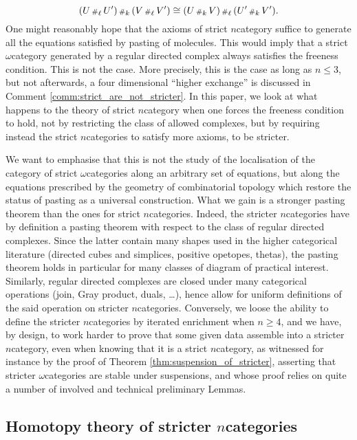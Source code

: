 \begin{equation*}
    (U \,{\scriptstyle\#}_{\ell}\, U') \,{\scriptstyle\#}_{k}\, (V \,{\scriptstyle\#}_{\ell}\, V') \cong (U \,{\scriptstyle\#}_{k}\, V) \,{\scriptstyle\#}_{\ell}\, (U' \,{\scriptstyle\#}_{k}\, V').
\end{equation*}
One might reasonably hope that the axioms of strict \( n \)\nbd category suffice to generate all the equations satisfied by pasting of molecules.
This would imply that a strict \( \omega \)\nbd category generated by a regular directed complex always satisfies the freeness condition. 
This is not the case.
More precisely, this is the case as long as \( n \le 3 \), but not afterwards, a four dimensional ``higher exchange'' is discussed in Comment \ref{comm:strict_are_not_stricter}.
In this paper, we look at what happens to the theory of strict \( n \)\nbd category when one forces the freeness condition to hold, not by restricting the class of allowed complexes, but by requiring instead the strict \( n \)\nbd categories to satisfy more axioms, to be stricter.

We want to emphasise that this is not the study of the localisation of the category of strict \( \omega \)\nbd categories along an arbitrary set of equations, but along the equations prescribed by the geometry of combinatorial topology which restore the status of pasting as a universal construction.
What we gain is a stronger pasting theorem than the ones for strict \( n \)\nbd categories.
Indeed, the stricter \( n \)\nbd categories have by definition a pasting theorem with respect to the class of regular directed complexes. 
Since the latter contain many shapes used in the higher categorical literature (directed cubes and simplices, positive opetopes, thetas), the pasting theorem holds in particular for many classes of diagram of practical interest.   
Similarly, regular directed complexes are closed under many categorical operations (join, Gray product, duals, \dots), hence allow for uniform definitions of the said operation on stricter \( n \)\nbd categories.
Conversely, we loose the ability to define the stricter \( n \)\nbd categories by iterated enrichment when \( n \geq 4 \), and we have, by design, to work harder to prove that some given data assemble into a stricter \( n \)\nbd category, even when knowing that it is a strict \( n \)\nbd category, as witnessed for instance by the proof of Theorem \ref{thm:suspension_of_stricter}, asserting that stricter \( \omega \)\nbd categories are stable under suspensions, and whose proof relies on quite a number of involved and technical preliminary Lemmas.  

\subsection*{Homotopy theory of stricter \( n \)\nbd categories}


